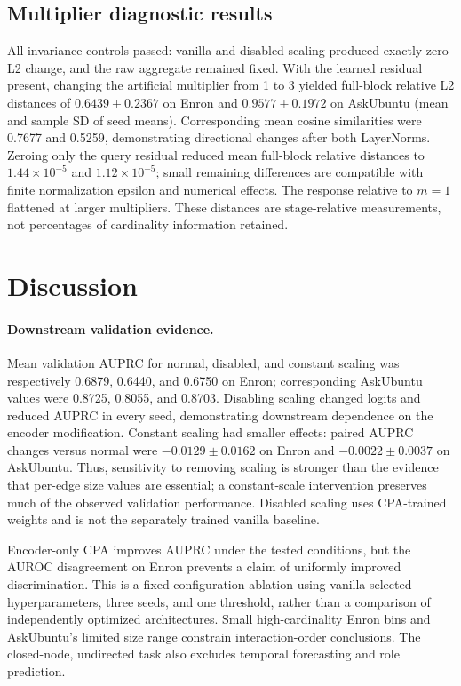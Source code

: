 \documentclass{article}
\begin{document}
\subsection{Multiplier diagnostic results}
All invariance controls passed: vanilla and disabled scaling produced exactly zero L2 change, and the raw aggregate remained fixed. With the learned residual present, changing the artificial multiplier from 1 to 3 yielded full-block relative L2 distances of $0.6439\pm0.2367$ on Enron and $0.9577\pm0.1972$ on AskUbuntu (mean and sample SD of seed means). Corresponding mean cosine similarities were 0.7677 and 0.5259, demonstrating directional changes after both LayerNorms. Zeroing only the query residual reduced mean full-block relative distances to $1.44\times10^{-5}$ and $1.12\times10^{-5}$; small remaining differences are compatible with finite normalization epsilon and numerical effects. The response relative to $m=1$ flattened at larger multipliers. These distances are stage-relative measurements, not percentages of cardinality information retained.

\section{Discussion}
\paragraph{Downstream validation evidence.}
Mean validation AUPRC for normal, disabled, and constant scaling was respectively 0.6879, 0.6440, and 0.6750 on Enron; corresponding AskUbuntu values were 0.8725, 0.8055, and 0.8703. Disabling scaling changed logits and reduced AUPRC in every seed, demonstrating downstream dependence on the encoder modification. Constant scaling had smaller effects: paired AUPRC changes versus normal were $-0.0129\pm0.0162$ on Enron and $-0.0022\pm0.0037$ on AskUbuntu. Thus, sensitivity to removing scaling is stronger than the evidence that per-edge size values are essential; a constant-scale intervention preserves much of the observed validation performance. Disabled scaling uses CPA-trained weights and is not the separately trained vanilla baseline.

Encoder-only CPA improves AUPRC under the tested conditions, but the AUROC disagreement on Enron prevents a claim of uniformly improved discrimination. This is a fixed-configuration ablation using vanilla-selected hyperparameters, three seeds, and one threshold, rather than a comparison of independently optimized architectures. Small high-cardinality Enron bins and AskUbuntu's limited size range constrain interaction-order conclusions. The closed-node, undirected task also excludes temporal forecasting and role prediction.
\end{document}
